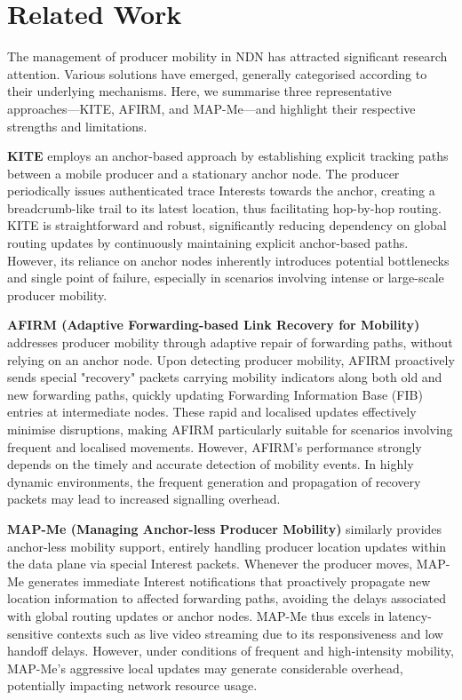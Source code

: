 \documentclass[conference]{IEEEtran}
\begin{document}
\section{Related Work}

The management of producer mobility in NDN has attracted significant research attention. Various solutions have emerged, generally categorised according to their underlying mechanisms. Here, we summarise three representative approaches—KITE, AFIRM, and MAP-Me—and highlight their respective strengths and limitations.

\textbf{KITE} \cite{KITE} employs an anchor-based approach by establishing explicit tracking paths between a mobile producer and a stationary anchor node. The producer periodically issues authenticated trace Interests towards the anchor, creating a breadcrumb-like trail to its latest location, thus facilitating hop-by-hop routing. KITE is straightforward and robust, significantly reducing dependency on global routing updates by continuously maintaining explicit anchor-based paths. However, its reliance on anchor nodes inherently introduces potential bottlenecks and single point of failure, especially in scenarios involving intense or large-scale producer mobility.

\textbf{AFIRM (Adaptive Forwarding-based Link Recovery for Mobility)} \cite{AFIRM} addresses producer mobility through adaptive repair of forwarding paths, without relying on an anchor node. Upon detecting producer mobility, AFIRM proactively sends special "recovery" packets carrying mobility indicators along both old and new forwarding paths, quickly updating Forwarding Information Base (FIB) entries at intermediate nodes. These rapid and localised updates effectively minimise disruptions, making AFIRM particularly suitable for scenarios involving frequent and localised movements. However, AFIRM's performance strongly depends on the timely and accurate detection of mobility events. In highly dynamic environments, the frequent generation and propagation of recovery packets may lead to increased signalling overhead.

\textbf{MAP-Me (Managing Anchor-less Producer Mobility)} \cite{MAPME} similarly provides anchor-less mobility support, entirely handling producer location updates within the data plane via special Interest packets. Whenever the producer moves, MAP-Me generates immediate Interest notifications that proactively propagate new location information to affected forwarding paths, avoiding the delays associated with global routing updates or anchor nodes. MAP-Me thus excels in latency-sensitive contexts such as live video streaming due to its responsiveness and low handoff delays. However, under conditions of frequent and high-intensity mobility, MAP-Me's aggressive local updates may generate considerable overhead, potentially impacting network resource usage.
\end{document}

